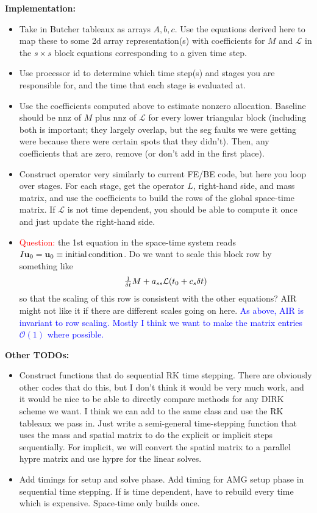 \documentclass[a4paper,10pt]{article}
\newcommand{\tcb}{\textcolor{blue}}
\begin{document}
\noindent\textbf{Implementation:}
\begin{itemize}
\item Take in Butcher tableaux as arrays $A,b,c$. Use the equations derived here to map these to some 2d array
representation(s) with coefficients for $M$ and $\mathcal{L}$ in the $s \times s$ block equations corresponding to
a given time step.

\item Use processor id to determine which time step(s) and stages you are responsible for, and the time that each
stage is evaluated at.

\item Use the coefficients computed above to estimate nonzero allocation. Baseline should be nnz of $M$ plus
nnz of $\mathcal{L}$ for every lower triangular block (including both is important; they largely overlap, but the
seg faults we were getting were because there were certain spots that they didn't). Then, any coefficients that
are zero, remove (or don't add in the first place).

\item Construct operator very similarly to current FE/BE code, but here you loop over stages. For each stage, get
the operator $L$, right-hand side, and mass matrix, and use the coefficients to build the rows of the global space-time
matrix. If $\mathcal{L}$ is not time dependent, you should be able to compute it once and just update the right-hand
side.

\item \textcolor{red}{Question:} the 1st equation in the space-time system reads $I \mathbf{u}_0 = \mathbf{u}_0 \equiv {\rm initial\, condition}$. Do we want to scale this block row by something like 
\[
\tfrac{1}{\delta t} M + a_{ss} {\cal L}(t_0 + c_s \delta t) 
\]
so that the scaling of this row is consistent with the other equations? AIR might not like it if there are different scales going on here.
\tcb{As above, AIR is invariant to row scaling. Mostly I think we want to make the matrix entries $\mathcal{O}(1)$ where possible.}

\end{itemize}

\noindent\textbf{Other TODOs:}
\begin{itemize}
\item Construct functions that do sequential RK time stepping. There are obviously other codes that do
this, but I don't think it would be very much work, and it would be nice to be able to directly compare methods
for any DIRK scheme we want. I think we can add to the same class and use the RK tableaux we pass in. 
Just write a semi-general time-stepping function that uses the mass and spatial matrix to do the
explicit or implicit steps sequentially. For implicit, we will convert the spatial matrix to a parallel hypre
matrix and use hypre for the linear solves. 

\item Add timings for setup and solve phase. Add timing for AMG setup phase in sequential time stepping.
If is time dependent, have to rebuild every time which is expensive. Space-time only builds once. 

\end{itemize}
\end{document}
